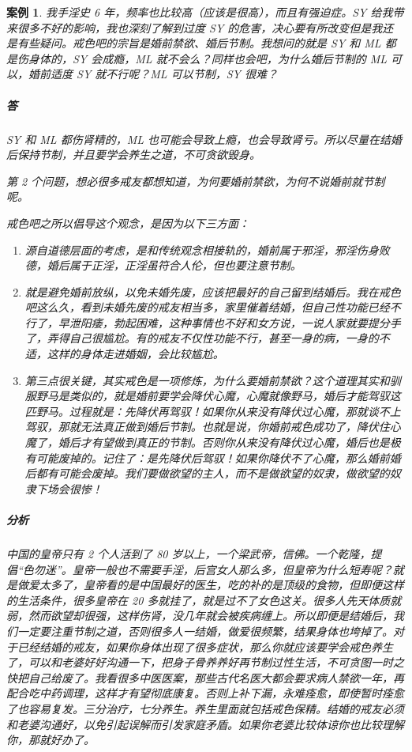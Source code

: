 \documentclass{ctexart}
\newtheorem{case}{案例}
\begin{document}
\begin{case}
    我手淫史 6 年，频率也比较高（应该是很高），而且有强迫症。SY 给我带来很多不好的影响，我也深刻了解到过度 SY 的危害，决心要有所改变但是我还是有些疑问。戒色吧的宗旨是婚前禁欲、婚后节制。我想问的就是 SY 和 ML 都是伤身体的，SY 会成瘾，ML 就不会么？同样也会吧，为什么婚后节制的 ML 可以，婚前适度 SY 就不行呢？ML 可以节制，SY 很难？

    \subparagraph{答} SY 和 ML 都伤肾精的，ML 也可能会导致上瘾，也会导致肾亏。所以尽量在结婚后保持节制，并且要学会养生之道，不可贪欲毁身。

    \rm 第 2 个问题，想必很多戒友都想知道，为何要婚前禁欲，为何不说婚前就节制呢。

    戒色吧之所以倡导这个观念，是因为以下三方面：

    \begin{enumerate}
        \item 源自道德层面的考虑，是和传统观念相接轨的，婚前属于邪淫，邪淫伤身败德，婚后属于正淫，正淫虽符合人伦，但也要注意节制。
        \item 就是避免婚前放纵，以免未婚先废，应该把最好的自己留到结婚后。我在戒色吧这么久，看到未婚先废的戒友相当多，家里催着结婚，但自己性功能已经不行了，早泄阳痿，勃起困难，这种事情也不好和女方说，一说人家就要提分手了，弄得自己很尴尬。有的戒友不仅性功能不行，甚至一身的病，一身的不适，这样的身体走进婚姻，会比较尴尬。
        \item 第三点很关键，其实戒色是一项修炼，为什么要婚前禁欲？这个道理其实和驯服野马是类似的，就是婚前要学会降伏心魔，心魔就像野马，婚后才能驾驭这匹野马。过程就是：先降伏再驾驭！如果你从来没有降伏过心魔，那就谈不上驾驭，那就无法真正做到婚后节制。也就是说，你婚前戒色成功了，降伏住心魔了，婚后才有望做到真正的节制。否则你从来没有降伏过心魔，婚后也是极有可能废掉的。记住了：是先降伏后驾驭！如果你降伏不了心魔，那么婚前婚后都有可能会废掉。我们要做欲望的主人，而不是做欲望的奴隶，做欲望的奴隶下场会很惨！
    \end{enumerate}

    \it \subparagraph{分析} 中国的皇帝只有 2 个人活到了 80 岁以上，一个梁武帝，信佛。一个乾隆，提倡“色勿迷”。皇帝一般也不需要手淫，后宫女人那么多，但皇帝为什么短寿呢？就是做爱太多了，皇帝看的是中国最好的医生，吃的补的是顶级的食物，但即便这样的生活条件，很多皇帝在 20 多就挂了，就是过不了女色这关。很多人先天体质就弱，然而欲望却很强，这样伤肾，没几年就会被疾病缠上。所以即便是结婚后，我们一定要注重节制之道，否则很多人一结婚，做爱很频繁，结果身体也垮掉了。对于已经结婚的戒友，如果你身体出现了很多症状，那么你就应该要学会戒色养生了，可以和老婆好好沟通一下，把身子骨养养好再节制过性生活，不可贪图一时之快把自己给废了。我看很多中医医案，那些古代名医大都会要求病人禁欲一年，再配合吃中药调理，这样才有望彻底康复。否则上补下漏，永难痊愈，即使暂时痊愈了也容易复发。三分治疗，七分养生。养生里面就包括戒色保精。结婚的戒友必须和老婆沟通好，以免引起误解而引发家庭矛盾。如果你老婆比较体谅你也比较理解你，那就好办了。
\end{case}
\end{document}
